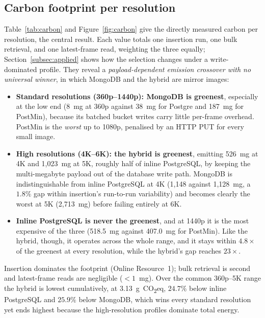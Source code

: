\documentclass[pdflatex,sn-basic]{sn-jnl}%
\begin{document}
\subsection{Carbon footprint per resolution}\label{subsec:carbon}
{\color{markup}Table~\ref{tab:carbon} and Figure~\ref{fig:carbon} give the directly measured carbon per resolution, the central result.} {\color{markup}Each value totals one insertion run, one bulk retrieval, and one latest-frame read, weighting the three equally; Section~\ref{subsec:applied} shows how the selection changes under a write-dominated profile.} {\color{markup}They reveal a \emph{payload-dependent emission crossover with no universal winner}, in which MongoDB and the hybrid are mirror images:}
\begin{itemize}
  \item {\color{markup}\textbf{Standard resolutions (360p--1440p): MongoDB is greenest}, especially at the low end (8~mg at 360p against 38~mg for Postgre and 187~mg for PostMin), because its batched bucket writes carry little per-frame overhead.} {\color{markup}PostMin is the \emph{worst} up to 1080p, penalised by an HTTP PUT for every small image.}
  \item {\color{markup}\textbf{High resolutions (4K--6K): the hybrid is greenest}, emitting 526~mg at 4K and 1{,}023~mg at 5K, roughly half of inline PostgreSQL, by keeping the multi-megabyte payload out of the database write path.} {\color{markup}MongoDB is indistinguishable from inline PostgreSQL at 4K (1{,}148 against 1{,}128~mg, a $1.8\%$ gap within insertion's run-to-run variability) and becomes clearly the worst at 5K (2{,}713~mg) before failing entirely at 6K.}
  \item {\color{markup}\textbf{Inline PostgreSQL is never the greenest}, and at 1440p it is the most expensive of the three (518.5~mg against 407.0~mg for PostMin).} {\color{markup}Like the hybrid, though, it operates across the whole range, and it stays within $4.8\times$ of the greenest at every resolution, while the hybrid's gap reaches $23\times$.}
\end{itemize}
{\color{markup}Insertion dominates the footprint (Online Resource~1); bulk retrieval is second and latest-frame reads are negligible ($<1$~mg).} {\color{markup}Over the common 360p--5K range the hybrid is lowest cumulatively, at 3.13~g~CO\textsubscript{2}eq, $24.7\%$ below inline PostgreSQL and $25.9\%$ below MongoDB, which wins every standard resolution yet ends highest because the high-resolution profiles dominate total energy.}
\end{document}
